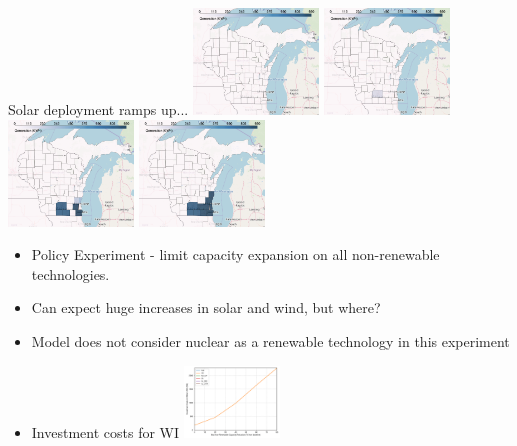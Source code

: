 \documentclass[xcolor=dvipsnames]{beamer}
\begin{document}
\begin{frame}
  Solar deployment ramps up...
  \includegraphics[width=0.25\textwidth]{includes/no_leakage_maxNR_solar_r0.png}
  \includegraphics[width=0.25\textwidth]{includes/no_leakage_maxNR_solar_r2.png}
  \includegraphics[width=0.25\textwidth]{includes/no_leakage_maxNR_solar_r3.png}
  \includegraphics[width=0.25\textwidth]{includes/no_leakage_maxNR_solar_r4.png}

\end{frame}

\begin{frame}

  \begin{itemize}
  \item Policy Experiment - limit capacity expansion on all non-renewable technologies.
  \item Can expect huge increases in solar and wind, but where?
  \item Model does not consider nuclear as a renewable technology in this experiment

  \item Investment costs for WI
    \includegraphics[width=0.2\textwidth]{includes/no_leakage_maxNR_invest_costs_by_region.png}

\end{itemize}
\end{frame}
\end{document}

